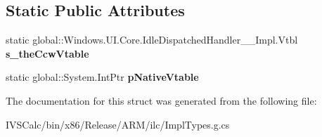 \subsection*{Static Public Attributes}
\begin{DoxyCompactItemize}
\item 
\mbox{\label{struct_windows_1_1_u_i_1_1_core_1_1_idle_dispatched_handler_____impl_1_1_vtbl_ac45dfabc63d0e9b67358dfee79122db8}} 
static global\+::\+Windows.\+U\+I.\+Core.\+Idle\+Dispatched\+Handler\+\_\+\+\_\+\+Impl.\+Vtbl {\bfseries s\+\_\+the\+Ccw\+Vtable}
\item 
\mbox{\label{struct_windows_1_1_u_i_1_1_core_1_1_idle_dispatched_handler_____impl_1_1_vtbl_a653ff93fd1980f9b327c0bf38074198e}} 
static global\+::\+System.\+Int\+Ptr {\bfseries p\+Native\+Vtable}
\end{DoxyCompactItemize}


The documentation for this struct was generated from the following file\+:\begin{DoxyCompactItemize}
\item 
I\+V\+S\+Calc/bin/x86/\+Release/\+A\+R\+M/ilc/Impl\+Types.\+g.\+cs\end{DoxyCompactItemize}
